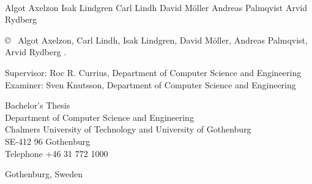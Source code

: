\newpage
\thispagestyle{plain}
\vspace*{4.5cm}
\oneLineTitle\\
Algot Axelzon \setlength{\parskip}{1cm}
Isak Lindgren \setlength{\parskip}{1cm}
Carl Lindh \setlength{\parskip}{1cm}
David Möller \setlength{\parskip}{1cm}
Andreas Palmqvist \setlength{\parskip}{1cm}
Arvid Rydberg \setlength{\parskip}{1cm}

\copyright ~ Algot Axelzon, Carl Lindh, Isak Lindgren, David Möller, Andreas Palmqvist, Arvid Rydberg \the\year. \setlength{\parskip}{1cm}

Supervisor: Roc R. Currius, Department of Computer Science and Engineering\\
Examiner: Sven Knutsson, Department of Computer Science and Engineering \setlength{\parskip}{1cm}

Bachelor's Thesis \the\year\\	%
Department of Computer Science and Engineering\\
Chalmers University of Technology and University of Gothenburg\\
SE-412 96 Gothenburg\\
Telephone +46 31 772 1000 \setlength{\parskip}{0.5cm}

\vfill


Gothenburg, Sweden \the\year


